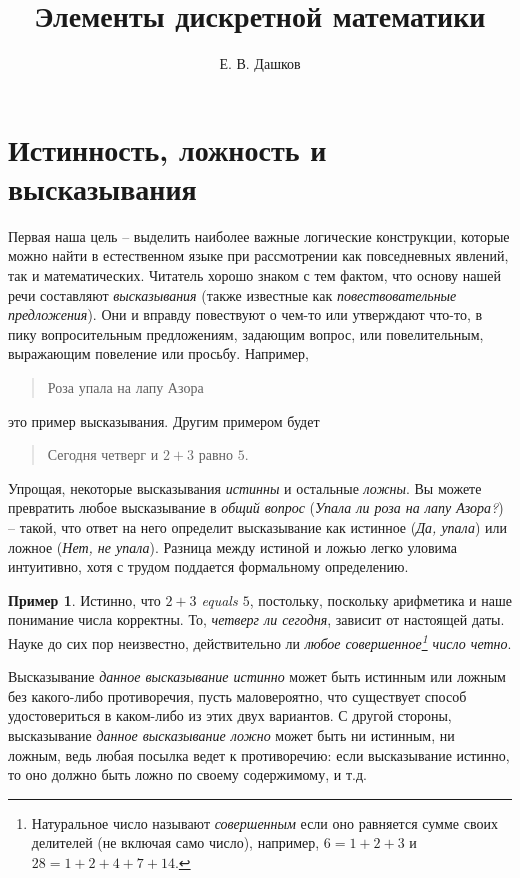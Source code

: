 \documentclass[12pt,notitlepage]{article}
\title{Элементы дискретной математики}
\author{Е. В. Дашков}
\theoremstyle{plain}
\theoremstyle{definition}
\newtheorem{exm}[thm]{Пример}
\theoremstyle{plain}
\newcommand{\1}{\mathbf{1}}
\newcommand{\0}{\mathbf{0}}
\newcommand{\mcomm}[1]{}
\begin{document}
\maketitle

\renewcommand\contentsname{Содержание}
\tableofcontents
\newpage

\section{Истинность, ложность и высказывания}\label{sect:1}

\mcomm{}

Первая наша цель – выделить наиболее важные логические конструкции, которые можно найти в естественном языке при рассмотрении как повседневных явлений, так и математических. Читатель хорошо знаком с тем фактом, что основу нашей речи составляют \emph{высказывания} (также известные как \emph{повествовательные предложения}). Они и вправду повествуют о чем-то или утверждают что-то, в пику вопросительным предложениям, задающим вопрос, или повелительным, выражающим повеление или просьбу. Например,
\begin{quote}
	Роза упала на лапу Азора
\end{quote}
это пример высказывания. Другим примером будет
\begin{quote}
	Сегодня четверг и $2 + 3$ равно $5$.
\end{quote}

Упрощая, некоторые высказывания \emph{истинны} и остальные \emph{ложны}. Вы можете превратить любое высказывание в \emph{общий вопрос} (\emph{Упала ли роза на лапу Азора?}) – такой, что ответ на него определит высказывание как истинное (\emph{Да, упала}) или ложное (\emph{Нет, не упала}). Разница между истиной и ложью легко уловима интуитивно, хотя с трудом поддается формальному определению.
\begin{exm}
	Истинно, что \emph{$2 + 3$ equals $5$}, постольку, поскольку арифметика и наше понимание числа корректны. То, \emph{четверг ли сегодня}, зависит от настоящей даты. Науке до сих пор неизвестно, действительно ли \emph{любое совершенное\footnote{Натуральное число называют \emph{совершенным} если оно равняется сумме своих делителей (не включая само число), например, $6 = 1 + 2 + 3$ и $28 = 1 + 2 + 4 + 7 + 14$.} число четно}.
	
	Высказывание \emph{данное высказывание истинно} может быть истинным или ложным без какого-либо противоречия, пусть маловероятно, что существует способ удостовериться в каком-либо из этих двух вариантов. С другой стороны, высказывание \emph{данное высказывание ложно} может быть ни истинным, ни ложным, ведь любая посылка ведет к противоречию: если высказывание истинно, то оно должно быть ложно по своему содержимому, и т.д.
\end{exm}
\end{document}
